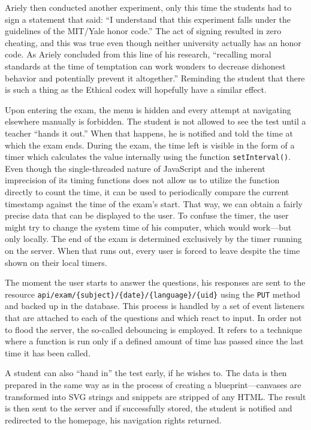 \documentclass[thesis=M,english,hidelinks]{FITthesis}[2012/10/20]
\newcommand{\code}{\texttt}
\begin{document}
Ariely then conducted another experiment, only this time the students had to sign a statement that said: ``I understand that this experiment falls under the guidelines of the MIT/Yale honor code.'' The act of signing resulted in zero cheating, and this was true even though neither university actually has an honor code. As Ariely concluded from this line of his research, ``recalling moral standards at the time of temptation can work wonders to decrease dishonest behavior and potentially prevent it altogether.'' Reminding the student that there is such a thing as the Ethical codex will hopefully have a similar effect.

Upon entering the exam, the menu is hidden and every attempt at navigating elsewhere manually is forbidden. The student is not allowed to see the test until a teacher ``hands it out.'' When that happens, he is notified and told the time at which the exam ends. During the exam, the time left is visible in the form of a timer which calculates the value internally using the function \code{setInterval()}. Even though the single-threaded nature of JavaScript and the inherent imprecision of its timing functions does not allow us to utilize the function directly to count the time, it can be used to periodically compare the current timestamp against the time of the exam's start. That way, we can obtain a fairly precise data that can be displayed to the user. To confuse the timer, the user might try to change the system time of his computer, which would work---but only locally. The end of the exam is determined exclusively by the timer running on the server. When that runs out, every user is forced to leave despite the time shown on their local timers.

The moment the user starts to answer the questions, his responses are sent to the resource \code{api/exam/\{subject\}/\{date\}/\{language\}/\{uid\}} using the \code{PUT} method and backed up in the database. This process is handled by a set of event listeners that are attached to each of the questions and which react to input. In order not to flood the server, the so-called debouncing is employed. It refers to a technique where a function is run only if a defined amount of time has passed since the last time it has been called.

A student can also ``hand in'' the test early, if he wishes to. The data is then prepared in the same way as in the process of creating a blueprint---canvases are transformed into SVG strings and snippets are stripped of any HTML. The result is then sent to the server and if successfully stored, the student is notified and redirected to the homepage, his navigation rights returned.
\end{document}
